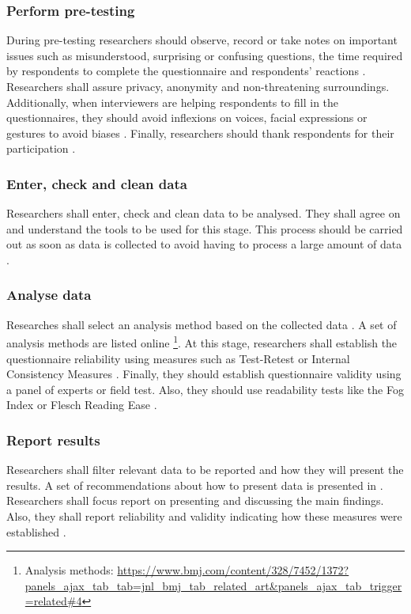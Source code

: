 \subsubsection{Perform pre-testing}
During pre-testing researchers should observe, record or take notes on important issues such as misunderstood, surprising or confusing questions, the time required by respondents to complete the questionnaire and respondents' reactions \cite{Boynton2004}. Researchers shall assure privacy, anonymity and non-threatening surroundings. Additionally, when interviewers are helping respondents to fill in the questionnaires, they should avoid inflexions on voices, facial expressions or gestures to avoid biases \cite{Boynton2004b}.
Finally, researchers should thank respondents for their participation \cite{Diem}.

\subsubsection{Enter, check and clean data}
Researchers shall enter, check and clean data to be analysed. They shall agree on and understand the tools to be used for this stage. This process should be carried out as soon as data is collected to avoid having to process a large amount of data \cite{Boynton2004}.

\subsubsection{Analyse data}
Researches shall select an analysis method based on the collected data \cite{Boynton2004,Diem}. A set of analysis methods are listed online \footnote{Analysis methods: \url{https://www.bmj.com/content/328/7452/1372?panels_ajax_tab_tab=jnl_bmj_tab_related_art&panels_ajax_tab_trigger=related\#4}}. At this stage, researchers shall establish the questionnaire reliability using measures such as Test-Retest or Internal Consistency Measures \cite{Radhakrishna2007,Diem}. Finally, they should establish questionnaire validity using a panel of experts or field test. Also, they should use readability tests like the Fog Index or Flesch Reading Ease \cite{Radhakrishna2007}.

\subsubsection{Report results}
Researchers shall filter relevant data to be reported \cite{Boynton2004,Diem} and how they will present the results. A set of recommendations about how to present data is presented in \cite{Boynton2004}. Researchers shall focus report on presenting and discussing the main findings. Also, they shall report reliability and validity indicating how these measures were established \cite{Radhakrishna2007}.

